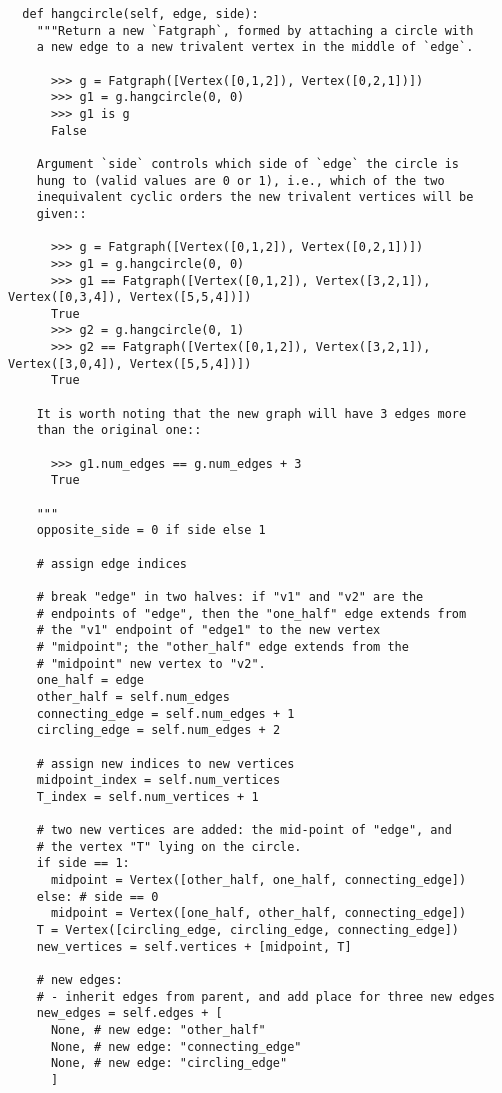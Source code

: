 \begin{lstlisting}
  def hangcircle(self, edge, side):
    """Return a new `Fatgraph`, formed by attaching a circle with
    a new edge to a new trivalent vertex in the middle of `edge`.

      >>> g = Fatgraph([Vertex([0,1,2]), Vertex([0,2,1])])
      >>> g1 = g.hangcircle(0, 0)
      >>> g1 is g
      False
      
    Argument `side` controls which side of `edge` the circle is
    hung to (valid values are 0 or 1), i.e., which of the two
    inequivalent cyclic orders the new trivalent vertices will be
    given::
    
      >>> g = Fatgraph([Vertex([0,1,2]), Vertex([0,2,1])])
      >>> g1 = g.hangcircle(0, 0)
      >>> g1 == Fatgraph([Vertex([0,1,2]), Vertex([3,2,1]), Vertex([0,3,4]), Vertex([5,5,4])])
      True
      >>> g2 = g.hangcircle(0, 1)
      >>> g2 == Fatgraph([Vertex([0,1,2]), Vertex([3,2,1]), Vertex([3,0,4]), Vertex([5,5,4])])
      True

    It is worth noting that the new graph will have 3 edges more
    than the original one::

      >>> g1.num_edges == g.num_edges + 3
      True
      
    """
    opposite_side = 0 if side else 1

    # assign edge indices
    
    # break "edge" in two halves: if "v1" and "v2" are the
    # endpoints of "edge", then the "one_half" edge extends from
    # the "v1" endpoint of "edge1" to the new vertex
    # "midpoint"; the "other_half" edge extends from the
    # "midpoint" new vertex to "v2".
    one_half = edge
    other_half = self.num_edges
    connecting_edge = self.num_edges + 1
    circling_edge = self.num_edges + 2
    
    # assign new indices to new vertices
    midpoint_index = self.num_vertices
    T_index = self.num_vertices + 1

    # two new vertices are added: the mid-point of "edge", and
    # the vertex "T" lying on the circle.
    if side == 1:
      midpoint = Vertex([other_half, one_half, connecting_edge])
    else: # side == 0
      midpoint = Vertex([one_half, other_half, connecting_edge])
    T = Vertex([circling_edge, circling_edge, connecting_edge])
    new_vertices = self.vertices + [midpoint, T]

    # new edges:
    # - inherit edges from parent, and add place for three new edges
    new_edges = self.edges + [
      None, # new edge: "other_half"
      None, # new edge: "connecting_edge"
      None, # new edge: "circling_edge"
      ]
    

\end{lstlisting}
